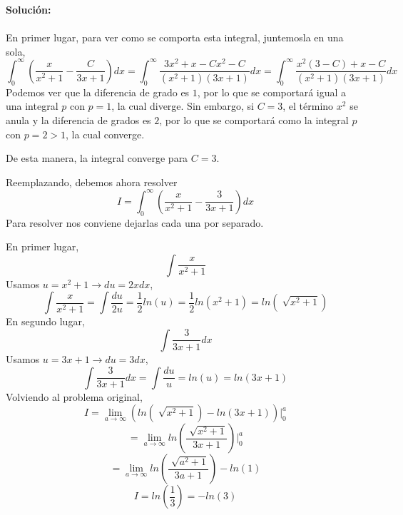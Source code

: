 \documentclass[12pt]{article}
\newenvironment{solucion}
{\begin{mdframed}[backgroundcolor=black!10]
		{\bf Solución:}\\
	}
	{
	\end{mdframed}
}
\newenvironment{preguntas}
{\begin{enumerate}\itemsep12pt
	}
	{
	\end{enumerate}
}
\newcommand{\ev}{\Big|}
\newcommand{\ra}{\rightarrow}
\begin{document}
\begin{preguntas}
\begin{solucion}
		\\
		En primer lugar, para ver como se comporta esta integral, juntemosla en una sola,
		\small$$\displaystyle\int_{0}^{\infty} \left( \dfrac{x}{x^2+1} - \dfrac{C}{3x+1}\right)dx
		= \displaystyle\int_{0}^{\infty} \dfrac{3x^2+x-Cx^2-C}{(x^2+1)(3x+1)}dx
		= \displaystyle\int_{0}^{\infty} \dfrac{x^2(3-C) + x - C}{(x^2+1)(3x+1)}dx$$
		Podemos ver que la diferencia de grado es $1$, por lo que se comportará igual a una integral $p$ con $p=1$, la cual diverge. Sin embargo, si $C=3$, el término $x^2$ se anula y la diferencia de grados es $2$, por lo que se comportará como la integral $p$ con $p=2>1$, la cual converge.
		
		De esta manera, la integral converge para $C=3$.
		
		Reemplazando, debemos ahora resolver
		$$I = \displaystyle\int_{0}^{\infty} \left( \dfrac{x}{x^2+1} - \dfrac{3}{3x+1}\right)dx$$
		Para resolver nos conviene dejarlas cada una por separado.
		
		En primer lugar,
		$$\displaystyle\int \dfrac{x}{x^2+1}$$
		Usamos $u = x^2+1 \ra du=2xdx$,
		$$\displaystyle\int \dfrac{x}{x^2+1} = \int\dfrac{du}{2u} = \dfrac{1}{2}ln(u) = \dfrac{1}{2}ln(x^2+1) = ln(\sqrt[]{x^2+1})$$
		En segundo lugar,
		$$\int \dfrac{3}{3x+1}dx$$
		Usamos $u=3x+1 \ra du = 3dx$,
		$$\int \dfrac{3}{3x+1}dx = \int \dfrac{du}{u} = ln(u) = ln(3x+1)$$
		Volviendo al problema original,
		$$I = \lim\limits_{a\ra \infty} (ln(\sqrt[]{x^2+1})-ln(3x+1)) \ev_0^a$$
		$$= \lim\limits_{a\ra \infty} ln \left( \dfrac{\sqrt[]{x^2+1}}{3x+1} \right) \ev_0^a$$
		$$= \lim\limits_{a\ra \infty} ln \left( \dfrac{\sqrt[]{a^2+1}}{3a+1} \right) - ln(1)$$
		$$I = ln\left(\dfrac{1}{3}\right) = -ln(3)$$
\end{solucion}
\end{preguntas}
\end{document}
